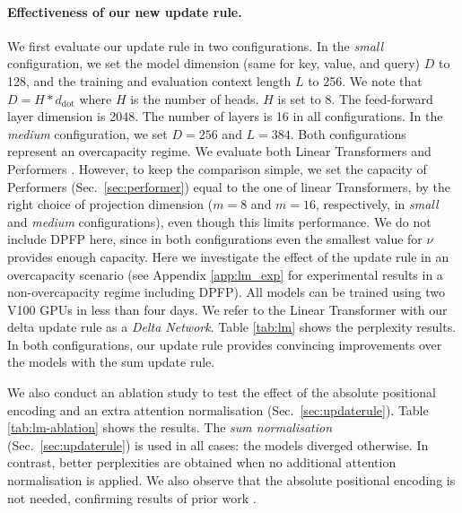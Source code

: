 \documentclass{article}
\theoremstyle{definition}
\begin{document}
\paragraph{Effectiveness of our new update rule.}
We first evaluate our update rule in two configurations.
In the \textit{small} configuration,
we set the model dimension (same for key, value, and query) $D$ to 128,
and the training and evaluation context length $L$ to 256.
We note that $D=H * d_\text{dot}$ where $H$ is the number of heads.
$H$ is set to 8. The feed-forward layer dimension is 2048.
The number of layers is 16 in all configurations.
In the \textit{medium} configuration, we set $D=256$ and $L=384$.
Both configurations represent an overcapacity regime.
We evaluate both Linear Transformers \citep{katharopoulos2020transformers}
and Performers \citep{choromanski2020rethinking}.
However, to keep the comparison simple,
we set the capacity of Performers (Sec.~\ref{sec:performer})
equal to the one of linear Transformers,
by the right choice of projection dimension ($m=8$ and $m=16$, respectively,
in \textit{small} and \textit{medium} configurations), even though this limits performance.
We do not include DPFP here, since in both configurations even the smallest value
for $\nu$ provides enough capacity.
Here we investigate the effect of the update rule in an overcapacity scenario
(see Appendix \ref{app:lm_exp} for experimental results in a non-overcapacity regime including DPFP).
All models can be trained using two V100 GPUs in less than four days.
We refer to the Linear Transformer with our delta update rule
as a \textit{Delta Network}.
Table \ref{tab:lm} shows the perplexity results.
In both configurations,
our update rule provides convincing improvements
over the models with the sum update rule.

We also conduct an ablation study to test the effect of
the absolute positional encoding and an extra attention normalisation (Sec.~\ref{sec:updaterule}).
Table \ref{tab:lm-ablation} shows the results.
The \textit{sum normalisation} (Sec.~\ref{sec:updaterule}) is
used in all cases: the models diverged otherwise.
In contrast, better perplexities are obtained when no additional attention normalisation
is applied.
We also observe that the absolute positional encoding is not needed,
confirming results of prior work \citep{irie19:trafolm}.
\end{document}
